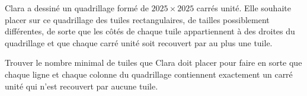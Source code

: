Clara a dessiné un quadrillage formé de $2025 \times 2025$ carrés
unité. Elle souhaite placer sur ce quadrillage des tuiles
rectangulaires, de tailles possiblement différentes, de sorte que les
côtés de chaque tuile appartiennent à des droites du quadrillage et
que chaque carré unité soit recouvert par au plus une tuile.

Trouver le nombre minimal de tuiles que Clara doit placer pour faire
en sorte que chaque ligne et chaque colonne du quadrillage contiennent
exactement un carré unité qui n'est recouvert par aucune tuile.
